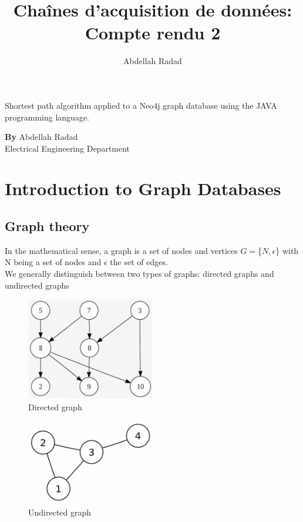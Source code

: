 \documentclass[]{report}
\author{Abdellah Radad}
\title{Chaînes d'acquisition de données: Compte rendu 2}
\begin{document}
	\begin{titlepage}
		\thispagestyle{titlepage}
		\begin{center}
			\begin{LARGE}
				Shortest path algorithm applied to a Neo4j graph database
				using the JAVA programming language.
			\end{LARGE}
		\end{center}
		
		\vskip 300pt
		{\centering  \textbf{By} Abdellah Radad }\\
		{\centering  Electrical Engineering Department }	
	\end{titlepage}
	\newpage
	\tableofcontents
	\newpage
	\listoffigures
	
	\chapter{Introduction to Graph Databases}
	\newpage
	\section{Graph theory}
	In the mathematical sense, a graph is a set of nodes and vertices $G  =$\{$N,\epsilon$\} with N being a set of nodes and $\epsilon$ the set of edges.\\
	We generally distinguish between two types of graphs: directed graphs and undirected graphs
	

	\begin{figure}[!htb]
			\centering
			\includegraphics[width=0.5\textwidth]{directed_graph.jpg}
			\caption{Directed  graph}
	\end{figure}
	\begin{figure}[!htb]
			\centering
			\includegraphics[width=0.5\textwidth]{undirected_graph.jpg}
			\caption{Undirected graph}
	\end{figure}
	
\end{document}
